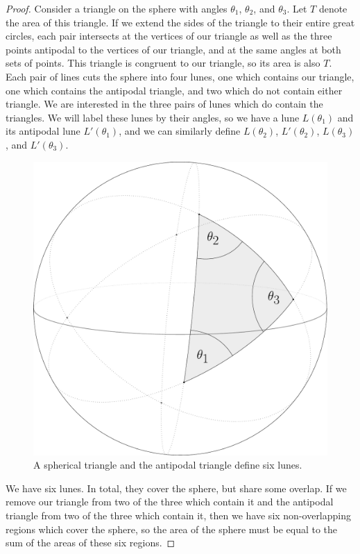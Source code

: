 \begin{proof}
	Consider a triangle on the sphere with angles $\theta_1$, $\theta_2$, and $\theta_3$.  Let $T$ denote the area of this triangle. If we extend the sides of the triangle to their entire great circles, each pair intersects at the vertices of our triangle as well as the three points antipodal to the vertices of our triangle, and at the same angles at both sets of points.  This triangle is congruent to our triangle, so its area is also $T$.  Each pair of lines cuts the sphere into four lunes, one which contains our triangle, one which contains the antipodal triangle, and two which do not contain either triangle.  We are interested in the three pairs of lunes which do contain the triangles.  We will label these lunes by their angles, so we have a lune $L(\theta_1)$ and its antipodal lune $L'(\theta_1)$, and we can similarly define $L(\theta_2)$, $L'(\theta_2)$, $L(\theta_3)$, and $L'(\theta_3)$.
	
	
	\begin{figure}[htb]
		\centering
		\includegraphics[width=.35\textwidth]{figs/trilune.pdf}
		\caption{A spherical triangle and the antipodal triangle define six lunes.}
		\label{fig:trilune}
	\end{figure}
	
	
	We have six lunes.  In total, they cover the sphere, but share some overlap.  If we remove our triangle from two of the three which contain it and the antipodal triangle from two of the three which contain it, then we have six non-overlapping regions which cover the sphere, so the area of the sphere must be equal to the sum of the areas of these six regions.  
	

\end{proof}
